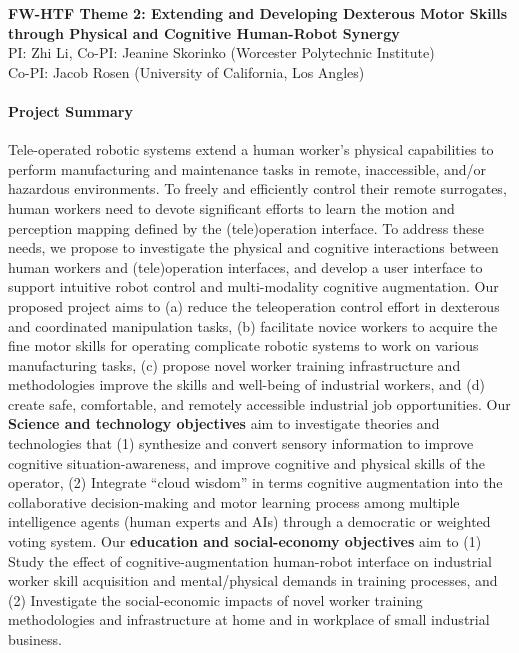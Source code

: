 \pagebreak

\begin{center}
	{\Large \bf FW-HTF Theme 2: \textbf{Extending and Developing Dexterous Motor Skills through Physical and Cognitive Human-Robot Synergy}}\\
    \vspace{4pt}
   	{\large PI: Zhi Li, Co-PI: Jeanine Skorinko (Worcester Polytechnic Institute)\\
    Co-PI: Jacob Rosen (University of California, Los Angles)}
\end{center}


\paragraph*{\Large Project Summary} 
Tele-operated robotic systems extend a human worker's physical capabilities to perform manufacturing and maintenance tasks in remote, inaccessible, and/or hazardous environments. To freely and efficiently control their remote surrogates, human workers need to devote significant efforts to learn the motion and perception mapping defined by the (tele)operation interface. To address these needs, we propose to investigate the physical and cognitive interactions between human workers and (tele)operation interfaces, and develop a user interface to support intuitive robot control and multi-modality cognitive augmentation. Our proposed project aims to (a) reduce the teleoperation control effort in dexterous and coordinated manipulation tasks, (b) facilitate novice workers to acquire the fine motor skills for operating complicate robotic systems to work on various manufacturing tasks, (c) propose novel worker training infrastructure and methodologies improve the skills and well-being of industrial workers, and (d) create safe, comfortable, and remotely accessible industrial job opportunities. Our \textbf{Science and technology objectives} aim to investigate theories and technologies that (1) synthesize and convert sensory information to improve cognitive situation-awareness, and improve cognitive and physical skills of the operator, (2) Integrate “cloud wisdom” in terms cognitive augmentation into the collaborative decision-making and motor learning process among multiple intelligence agents (human experts and AIs) through a democratic or weighted voting system. Our \textbf{education and social-economy objectives} aim to (1) Study the effect of cognitive-augmentation human-robot interface on industrial worker skill acquisition and mental/physical demands in training processes, and (2) Investigate the social-economic impacts of novel worker training methodologies and infrastructure at home and in workplace of small industrial business.  

